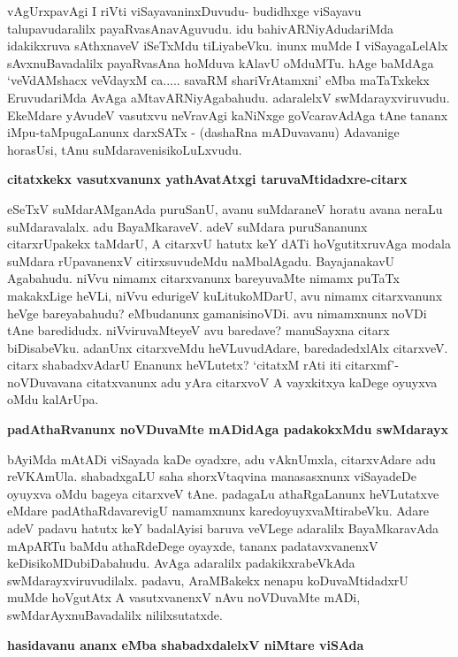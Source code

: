 \noindent
vAgUrxpavAgi I riVti viSayavaninxDuvudu- budidhxge viSayavu talupavudaralilx payaRvasAna\-vAguvudu. idu bahivARNiyAdudariMda idakikxruva sAthxnaveV iSeTxMdu tiLiyabeVku. inunx muMde I viSayagaLelAlx sAvxnuBavadalilx payaRvasAna hoMduva kAlavU oMduMTu. hAge baMdAga\- `veV\-dAMshacx veVdayxM ca..... savaRM shariVrAtamxni' eMba maTaTxkekx EruvudariMda AvAga aMtavARNiyAga\-bahudu. adaralelxV swMdarayxviruvudu. EkeMdare yAvudeV vasutxvu neVravAgi kaNiNxge goVcaravAdAga tAne tananx iMpu-taMpugaLanunx darxSATx - (dashaRna mADuvavanu) Adavanige horasUsi, tAnu suMdaravenisikoLuLxvudu.

{\bigskip
\noindent
{\large\bf citatxkekx vasutxvanunx yathAvatAtxgi taruvaMtidadxre-citarx}}\label{page200}
\medskip

\noindent
eSeTxV suMdarAMganAda puruSanU, avanu suMdaraneV horatu avana neraLu suMdaravalalx. adu BayaMkaraveV. adeV suMdara puruSananunx citarxrUpakekx taMdarU, A citarxvU hatutx keY dATi hoVgutitxru\-vAga modala suMdara rUpavanenxV citirxsuvudeMdu naMbalAgadu. BayajanakavU Agabahudu. niVvu nimamx citarxvanunx bareyuvaMte nimamx puTaTx makakxLige heVLi, niVvu edurigeV kuLitukoMDarU, avu nimamx citarxvanunx heVge bareyabahudu? eMbudanunx gamanisinoVDi. avu nimamxnunx noVDi tAne baredidudx. niVviruvaMteyeV avu baredave? manuSayxna citarx biDisabeVku. adanUnx citarxveMdu heVLuvudAdare, baredadedxlAlx citarxveV. citarx shabadxvAdarU Enanunx heVLutetx? `citatxM rAti iti citarxmf'-noVDuva\-vana citatx\-vanunx adu yAra citarxvoV A vayxkitxya kaDege oyuyxva oMdu kalArUpa.

{\bigskip
\noindent
{\large\bf padAthaRvanunx noVDuvaMte mADidAga padakokxMdu swMdarayx}}\label{page201}
\medskip

\noindent
bAyiMda mAtADi viSayada kaDe oyadxre, adu vAknUmxla, citarxvAdare adu reVKAmUla. shabadx\-gaLU saha shorxVtaqvina manasasxnunx viSayadeDe oyuyxva oMdu bageya citarxveV tAne. padagaLu athaRga\-Lanunx heVLutatxve eMdare padAthaRdavarevigU namamxnunx karedoyuyxvaMtirabeVku. Adare adeV padavu hatutx keY badalAyisi baruva veVLege adaralilx BayaMkaravAda mApARTu baMdu athaRdeDege oyayxde,\- tananx padatavxvanenxV keDisikoMDubiDabahudu. AvAga adaralilx padakikxrabeVkAda swMdarayxviruvu\-dilalx. padavu,\- AraMBakekx nenapu koDuvaMtidadxrU muMde hoVgutAtx A vasutxvanenxV nAvu noVDuvaMte mADi, swMdarAyxnuBavadalilx nililxsutatxde.

\eject

{\noindent
{\large\bf hasidavanu ananx eMba shabadxdalelxV niMtare viSAda}}\label{page201}
\medskip

